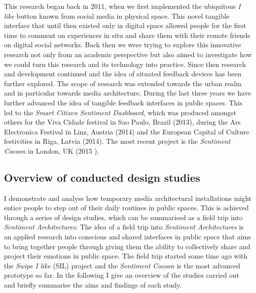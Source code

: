 This research began back in 2011, when we first implemented the ubiquitous \textit{I like} button known from social media in physical space. This novel tangible interface that until then existed only in digital space allowed people for the first time to comment on experiences in situ and share them with their remote friends on digital social networks. Back then we were trying to explore this innovative research not only from an academic perspective but also aimed to investigate how we could turn this research and its technology into practice. Since then research and development continued and the idea of situated feedback devices has been further explored. The scope of research was extended towards the urban realm and in particular towards media architecture. During the last three years we have further advanced the idea of tangible feedback interfaces in public spaces. This led to the \textit{Smart Citizen Sentiment Dashboard}, which was produced amongst others for the Viva Cidade festival in Sao Paulo, Brazil (2013), during the Ars Electronica Festival in Linz, Austria (2014) and the European Capital of Culture festivities in Riga, Latvia (2014). The most recent project is the \textit{Sentiment Cocoon} in London, UK (2015 ).


\subsection*{Overview of conducted design studies}

I demonstrate and analyse how temporary media architectural installations might entice people to step out of their daily routines in public spaces. This is achieved through a series of design studies, which can be summarised as a field trip into \textit{Sentiment Architectures}. 
The idea of a field trip into \textit{Sentiment Architectures} is an applied research into conscious and shared interfaces in public space that aims to bring together people through giving them the ability to collectively share and project their emotions in public space. The field trip started some time ago with the \textit{Swipe I like} (SIL) project and the \textit{Sentiment Cocoon} is the most advanced prototype so far. In the following I give an overview of the studies carried out and briefly summarise the aims and findings of each study.


